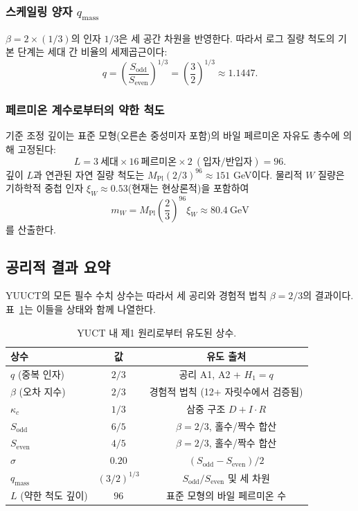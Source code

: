 \documentclass[11pt,a4paper]{article}
\begin{document}
	\subsubsection{스케일링 양자 \(q_{\text{mass}}\)}
	\(\beta = 2 \times (1/3)\)의 인자 \(1/3\)은 세 공간 차원을 반영한다. 따라서 로그 질량 척도의 기본 단계는 세대 간 비율의 세제곱근이다:
	\[
	\boxed{q = \left(\frac{S_{\mathrm{odd}}}{S_{\mathrm{even}}}\right)^{1/3} = \left(\frac{3}{2}\right)^{1/3} \approx 1.1447}.
	\]
	
	\subsubsection{페르미온 계수로부터의 약한 척도}
	기준 조정 깊이는 표준 모형(오른손 중성미자 포함)의 바일 페르미온 자유도 총수에 의해 고정된다:
	\[
	L = 3\ \text{세대} \times 16\ \text{페르미온} \times 2\ (\text{입자/반입자}) = 96.
	\]
	깊이 \(L\)과 연관된 자연 질량 척도는 \(M_{\mathrm{Pl}} (2/3)^{96} \approx 151\) GeV이다. 물리적 \(W\) 질량은 기하학적 중첩 인자 \(\xi_W \approx 0.53\)(현재는 현상론적)을 포함하여
	\[
	m_W = M_{\mathrm{Pl}} \left(\frac{2}{3}\right)^{96} \xi_W \approx 80.4\ \text{GeV}
	\]
	를 산출한다.
	
	\subsection{공리적 결과 요약}
	
	YUUCT의 모든 필수 수치 상수는 따라서 세 공리와 경험적 법칙 \(\beta=2/3\)의 결과이다. 표~\ref{tab:derived-constants}는 이들을 상태와 함께 나열한다.
	
	\begin{table}[H]
		\centering
		\caption{YUCT 내 제1 원리로부터 유도된 상수.}
		\label{tab:derived-constants}
		\begin{tabular}{l c c}
			\toprule
			\textbf{상수} & \textbf{값} & \textbf{유도 출처} \\
			\midrule
			\(q\) (중복 인자) & \(2/3\) & 공리 A1, A2 + \(H_1=q\) \\
			\(\beta\) (오차 지수) & \(2/3\) & 경험적 법칙 (12+ 자릿수에서 검증됨) \\
			\(\kappa_c\) & \(1/3\) & 삼중 구조 \(D+I\!\cdot\!R\) \\
			\(S_{\mathrm{odd}}\) & \(6/5\) & \(\beta=2/3\), 홀수/짝수 합산 \\
			\(S_{\mathrm{even}}\) & \(4/5\) & \(\beta=2/3\), 홀수/짝수 합산 \\
			\(\sigma\) & \(0.20\) & \((S_{\mathrm{odd}}-S_{\mathrm{even}})/2\) \\
			\(q_{\text{mass}}\) & \((3/2)^{1/3}\) & \(S_{\mathrm{odd}}/S_{\mathrm{even}}\) 및 세 차원 \\
			\(L\) (약한 척도 깊이) & \(96\) & 표준 모형의 바일 페르미온 수 \\
			\bottomrule
		\end{tabular}
	\end{table}
	
\end{document}
